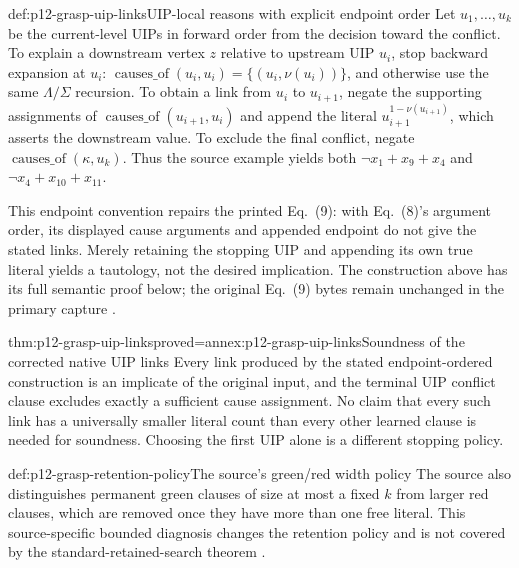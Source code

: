 \begin{hbmethod}{def:p12-grasp-uip-links}{UIP-local reasons with explicit endpoint order}
Let \(u_1,\ldots,u_k\) be the current-level UIPs in forward order from
the decision toward the conflict.  To explain a downstream vertex \(z\)
relative to upstream UIP \(u_i\), stop backward expansion at \(u_i\):
\(\operatorname{causes\_of}(u_i,u_i)=\{(u_i,\nu(u_i))\}\), and otherwise
use the same \(\Lambda/\Sigma\) recursion.  To obtain a link from \(u_i\)
to \(u_{i+1}\), negate the supporting assignments of
\(\operatorname{causes\_of}(u_{i+1},u_i)\) and append the literal
\(u_{i+1}^{1-\nu(u_{i+1})}\), which asserts the downstream value.  To
exclude the final conflict, negate
\(\operatorname{causes\_of}(\kappa,u_k)\).  Thus the source example yields
both \(\neg x_1+x_9+x_4\) and \(\neg x_4+x_{10}+x_{11}\).

This endpoint convention repairs the printed Eq.~(9): with Eq.~(8)'s argument
order, its displayed cause arguments and appended endpoint do not give the
stated links.  Merely retaining the stopping UIP and appending its own true
literal yields a tautology, not the desired implication.  The construction
above has its full semantic proof below; the original Eq.~(9) bytes remain
unchanged in the primary capture
\cite[Sec.~3.2.2; Eqs.~(8)--(9)]{MarquesSilvaSakallah1999}.
\end{hbmethod}

\begin{hblemma}{thm:p12-grasp-uip-links}{proved=annex:p12-grasp-uip-links}{Soundness of the corrected native UIP links}
Every link produced by the stated endpoint-ordered construction is an
implicate of the original input, and the terminal UIP conflict clause excludes
exactly a sufficient cause assignment.  No claim that every such link has a
universally smaller literal count than every other learned clause is needed
for soundness.  Choosing the first UIP alone is a different stopping policy.
\end{hblemma}

\begin{hbmethod}{def:p12-grasp-retention-policy}{The source's green/red width policy}
The source also distinguishes permanent green clauses of size at most a
fixed \(k\) from larger red clauses, which are removed once they have more
than one free literal.  This source-specific bounded diagnosis changes the
retention policy and is not covered by the standard-retained-search theorem
\cite[Sec.~3.2.1]{MarquesSilvaSakallah1999}.
\end{hbmethod}

